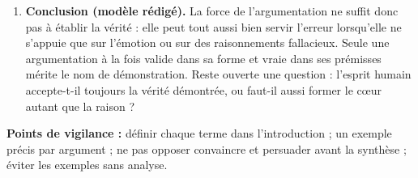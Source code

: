 \documentclass[11pt]{article}
\begin{document}
\begin{corrige}
\begin{enumerate}
\begin{enumerate}
\item \emph{Synthèse.} La force argumentative ne suffit pas : il faut distinguer \emph{convaincre} (par la raison, avec prémisses vraies et raisonnement valide) et \emph{persuader} (par les émotions). La vérité n'est établie que lorsque la validité formelle s'unit à la vérité matérielle des prémisses.
\end{enumerate}
\item \textbf{Conclusion (modèle rédigé).} La force de l'argumentation ne suffit donc pas à établir la vérité : elle peut tout aussi bien servir l'erreur lorsqu'elle ne s'appuie que sur l'émotion ou sur des raisonnements fallacieux. Seule une argumentation à la fois valide dans sa forme et vraie dans ses prémisses mérite le nom de démonstration. Reste ouverte une question : l'esprit humain accepte-t-il toujours la vérité démontrée, ou faut-il aussi former le cœur autant que la raison ?
\end{enumerate}
\textbf{Points de vigilance :} définir chaque terme dans l'introduction ; un exemple précis par argument ; ne pas opposer convaincre et persuader avant la synthèse ; éviter les exemples sans analyse.
\end{corrige}
\end{document}
